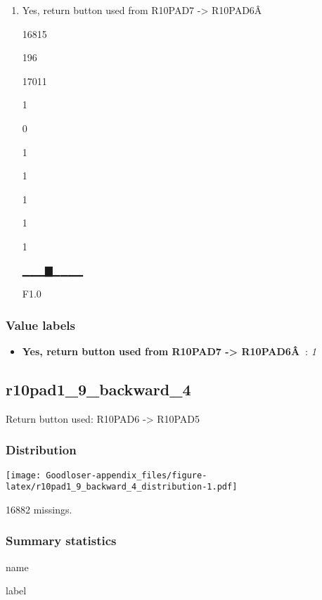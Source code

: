 \documentclass[]{book}
\providecommand{\tightlist}{%
  \setlength{\itemsep}{0pt}\setlength{\parskip}{0pt}}
\begin{document}
\begin{enumerate}
\def\labelenumi{\arabic{enumi}.}
\tightlist
\item
  Yes, return button used from R10PAD7 -\textgreater{} R10PAD6Â

  16815

  196

  17011

  1

  0

  1

  1

  1

  1

  1

  ▁▁▁▇▁▁▁▁

  F1.0
\end{enumerate}

\subsubsection{Value labels}\label{r10pad1_9_backward_3_labels}

\begin{itemize}
\tightlist
\item
  \textbf{Yes, return button used from R10PAD7 -\textgreater{}
  R10PAD6Â~}: \emph{1}
\end{itemize}

\subsection{r10pad1\_9\_backward\_4}\label{r10pad1_9_backward_4}

Return button used: R10PAD6 -\textgreater{} R10PAD5

\subsubsection{Distribution}\label{r10pad1_9_backward_4_distribution}

\texttt{[image: Goodloser-appendix\_files/figure-latex/r10pad1\_9\_backward\_4\_distribution-1.pdf]}

16882 missings.

\subsubsection{Summary statistics}\label{r10pad1_9_backward_4_summary}

name

label
\end{document}
